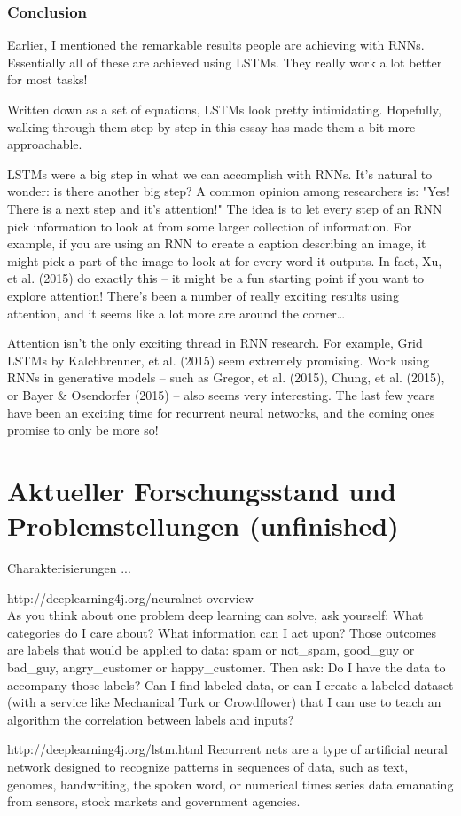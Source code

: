 {\subsubsection{Conclusion}
Earlier, I mentioned the remarkable results people are achieving with RNNs. Essentially all of these are achieved using LSTMs. They really work a lot better for most tasks!

Written down as a set of equations, LSTMs look pretty intimidating. Hopefully, walking through them step by step in this essay has made them a bit more approachable.

LSTMs were a big step in what we can accomplish with RNNs. It’s natural to wonder: is there another big step? A common opinion among researchers is: "Yes! There is a next step and it’s attention!" The idea is to let every step of an RNN pick information to look at from some larger collection of information. For example, if you are using an RNN to create a caption describing an image, it might pick a part of the image to look at for every word it outputs. In fact, Xu, et al. (2015) do exactly this – it might be a fun starting point if you want to explore attention! There’s been a number of really exciting results using attention, and it seems like a lot more are around the corner…

Attention isn’t the only exciting thread in RNN research. For example, Grid LSTMs by Kalchbrenner, et al. (2015) seem extremely promising. Work using RNNs in generative models – such as Gregor, et al. (2015), Chung, et al. (2015), or Bayer \& Osendorfer (2015) – also seems very interesting. The last few years have been an exciting time for recurrent neural networks, and the coming ones promise to only be more so!


\section{Aktueller Forschungsstand und Problemstellungen (unfinished)}
Charakterisierungen ...

http://deeplearning4j.org/neuralnet-overview\\
As you think about one problem deep learning can solve, ask yourself: What categories do I care about? What information can I act upon? Those outcomes are labels that would be applied to data: spam or not\_spam, good\_guy or bad\_guy, angry\_customer or happy\_customer. Then ask: Do I have the data to accompany those labels? Can I find labeled data, or can I create a labeled dataset (with a service like Mechanical Turk or Crowdflower) that I can use to teach an algorithm the correlation between labels and inputs?

http://deeplearning4j.org/lstm.html
Recurrent nets are a type of artificial neural network designed to recognize patterns in sequences of data, such as text, genomes, handwriting, the spoken word, or numerical times series data emanating from sensors, stock markets and government agencies.

} %